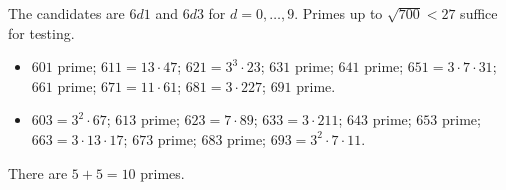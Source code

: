 The candidates are $6d1$ and $6d3$ for $d=0,\dots,9$. Primes up to $\sqrt{700}<27$ suffice for testing.
\begin{itemize}
\item $601$ prime; $611=13\cdot47$; $621=3^3\cdot23$; $631$ prime; $641$ prime; $651=3\cdot7\cdot31$; $661$ prime; $671=11\cdot61$; $681=3\cdot227$; $691$ prime.
\item $603=3^2\cdot67$; $613$ prime; $623=7\cdot89$; $633=3\cdot211$; $643$ prime; $653$ prime; $663=3\cdot13\cdot17$; $673$ prime; $683$ prime; $693=3^2\cdot7\cdot11$.
\end{itemize}
There are $5+5=\boxed{10}$ primes.
